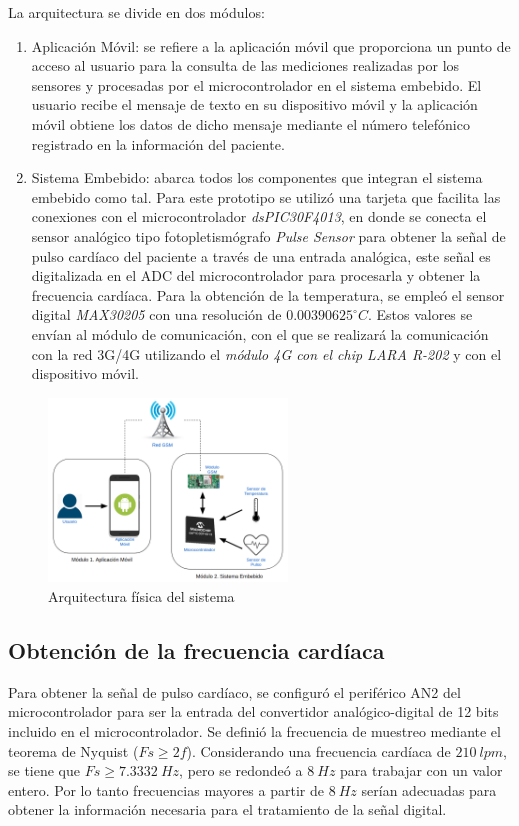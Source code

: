 \documentclass[journal]{IEEEtran}
\begin{document}
La arquitectura se divide en dos módulos:
\begin{enumerate}
	\item Aplicación Móvil: se refiere a la aplicación móvil que proporciona un punto de acceso al usuario para la consulta de las mediciones realizadas por los sensores y procesadas por el microcontrolador en el sistema embebido. El usuario recibe el mensaje de texto en su dispositivo móvil y la aplicación móvil obtiene los datos de dicho mensaje mediante el número telefónico registrado en la información del paciente. 
	
	\item Sistema Embebido: abarca todos los componentes que integran el sistema embebido como tal. Para este prototipo se utilizó una tarjeta que facilita las conexiones con el microcontrolador \textit{dsPIC30F4013}, en donde se conecta el sensor analógico tipo fotopletismógrafo \textit{Pulse Sensor} para obtener la señal de pulso cardíaco del paciente a través de una entrada analógica, este señal es digitalizada en el ADC del microcontrolador para procesarla y obtener la frecuencia cardíaca. Para la obtención de la temperatura, se empleó el sensor digital \textit{MAX30205} con una resolución de $0.00390625^{\circ}C$. Estos valores se envían al módulo de comunicación, con el que se realizará la comunicación con la red 3G/4G utilizando el \textit{módulo 4G con el chip LARA R-202} y con el dispositivo móvil.
\end{enumerate}

\begin{figure}[htbp!]
	\centering
	\includegraphics[width=2.5in]{imagenes/arquifisica.png}
	\caption{Arquitectura física del sistema}
	\label{fig:DisenoArquiFisica}
\end{figure}

\subsection{Obtención de la frecuencia cardíaca}
Para obtener la señal de pulso cardíaco, se configuró el periférico AN2 del microcontrolador para ser la entrada del convertidor analógico-digital de 12 bits incluido en el microcontrolador. Se definió la frecuencia de muestreo mediante el teorema de Nyquist ($Fs \geq 2f$). Considerando una frecuencia cardíaca de $210\ lpm$, se tiene que $Fs \geq 7.3332\ Hz$, pero se redondeó a $8\ Hz$ para trabajar con un valor entero. Por lo tanto frecuencias mayores a partir de $8\ Hz$ serían adecuadas para obtener la información necesaria para el tratamiento de la señal digital.\\
\end{document}
